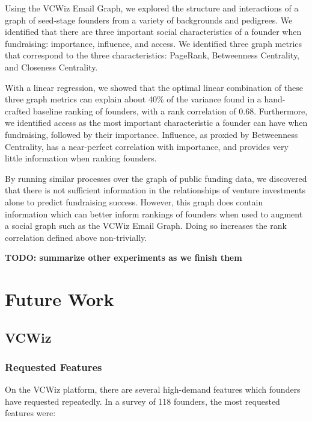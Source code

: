 Using the VCWiz Email Graph, we explored the structure and interactions of a graph of seed-stage founders from a variety of backgrounds and pedigrees. We identified that there are three important social characteristics of a founder when fundraising: importance, influence, and access. We identified three graph metrics that correspond to the three characteristics: PageRank, Betweenness Centrality, and Closeness Centrality.

With a linear regression, we showed that the optimal linear combination of these three graph metrics can explain about 40\% of the variance found in a hand-crafted baseline ranking of founders, with a rank correlation of $0.68$. Furthermore, we identified access as the most important characteristic a founder can have when fundraising, followed by their importance. Influence, as proxied by Betweenness Centrality, has a near-perfect correlation with importance, and provides very little information when ranking founders.

By running similar processes over the graph of public funding data, we discovered that there is not sufficient information in the relationships of venture investments alone to predict fundraising success. However, this graph does contain information which can better inform rankings of founders when used to augment a social graph such as the VCWiz Email Graph. Doing so increases the rank correlation defined above non-trivially.

\textbf{TODO: summarize other experiments as we finish them}

\section{Future Work}

\subsection{VCWiz}

\subsubsection{Requested Features}

On the VCWiz platform, there are several high-demand features which founders have requested repeatedly. In a survey of 118 founders, the most requested features were:

